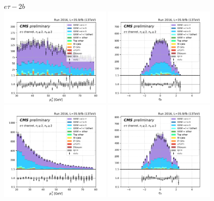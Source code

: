\begin{figure}[ht]
    \centering
    $e\tau - 2b$ \\
    \includegraphics[width=0.49\textwidth]{chapters/Analysis/sectionPlots/figures/kinematics_pickles/etau/2b/etau_2b_lepton1_pt.pdf}
    \includegraphics[width=0.49\textwidth]{chapters/Analysis/sectionPlots/figures/kinematics_pickles/etau/2b/etau_2b_lepton1_eta.pdf}
    \includegraphics[width=0.49\textwidth]{chapters/Analysis/sectionPlots/figures/kinematics_pickles/etau/2b/etau_2b_lepton2_pt.pdf}
    \includegraphics[width=0.49\textwidth]{chapters/Analysis/sectionPlots/figures/kinematics_pickles/etau/2b/etau_2b_lepton2_eta.pdf}

\end{figure}
